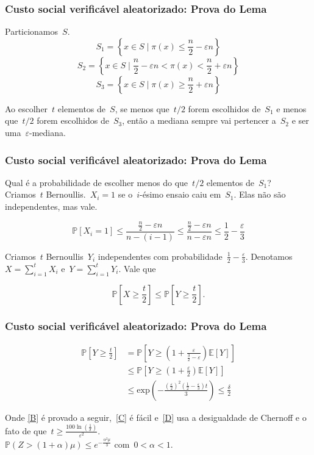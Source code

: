 \documentclass[usenames,dvipsnames]{beamer}
\begin{document}
\begin{frame}
\frametitle{Custo social verificável aleatorizado: Prova do Lema}
Particionamos~$S$.
$$S_1 = \left\{ x \in S \mid \pi(x) \leq \frac{n}{2} - \varepsilon n \right\}$$
$$S_2 = \left\{ x \in S \mid \frac{n}{2} - \varepsilon n < \pi(x) < \frac{n}{2} + \varepsilon n\right\}$$
$$S_3 = \left\{ x \in S \mid \pi(x) \geq \frac{n}{2} + \varepsilon n \right\}$$

Ao escolher~$t$ elementos de~$S$, se menos que~$t/2$ forem escolhidos de~$S_1$ e menos que~$t/2$ forem escolhidos de~$S_3$, então a mediana sempre vai pertencer a~$S_2$ e ser uma~$\varepsilon$-mediana.
\end{frame}

\begin{frame}
\frametitle{Custo social verificável aleatorizado: Prova do Lema}
Qual é a probabilidade de escolher menos do que~$t/2$ elementos de~$S_1$? \\

Criamos~$t$ Bernoullis.~$X_i = 1$ se o~$i$-ésimo ensaio caiu em~$S_1$. Elas não são independentes, mas vale.

\begin{equation*}
\mathbb{P}[X_i = 1] \leq \frac{\frac{n}{2} - \varepsilon n}{n - (i-1)} \leq \frac{\frac{n}{2} - \varepsilon n}{n - \varepsilon n} \leq \frac{1}{2} - \frac{\varepsilon}{3}
\end{equation*}

Criamos~$t$ Bernoullis~$Y_i$ independentes com probabilidade~$\frac{1}{2} - \frac{\varepsilon}{3}$. Denotamos~$X = \sum\limits_{i=1}^t X_i$ e~$Y = \sum\limits_{i=1}^t Y_i$. Vale que

$$ \mathbb{P}\left[ X \geq \frac{t}{2} \right] \leq \mathbb{P}\left[ Y \geq \frac{t}{2} \right] \text{.} $$
\end{frame}

\begin{frame}
\frametitle{Custo social verificável aleatorizado: Prova do Lema}

\begin{align}
\mathbb{P}\left[ Y \geq \frac{t}{2} \right] & = \mathbb{P}\left[ Y  \geq \left( 1 + \frac{\varepsilon}{\frac{3}{2} - \varepsilon} \right) \mathbb{E}\left[ Y \right]  \right] \label{B} \\
& \leq \mathbb{P}\left[ Y \geq \left(1 + \frac{\varepsilon}{2}\right) \mathbb{E}\left[ Y \right] \right] \label{C} \\
& \leq \text{exp}\left( - \frac{\left(\frac{\varepsilon}{2}\right)^2\left(\frac{1}{2} - \frac{\varepsilon}{3} \right)t}{3} \right) \leq \frac{\delta}{2} \label{D}
\end{align}


Onde \eqref{B} é provado a seguir,~\eqref{C} é fácil e~\eqref{D} usa a desigualdade de Chernoff e o fato de que~$t \geq \frac{100\ln(\frac{1}{\delta})}{\varepsilon^2}$. \\
\pause
$\mathbb{P}(Z > (1 + \alpha)\mu) \leq e^{-\frac{\alpha^2 \mu}{3}}$ com~$0 < \alpha < 1$.

\end{frame}
\end{document}
